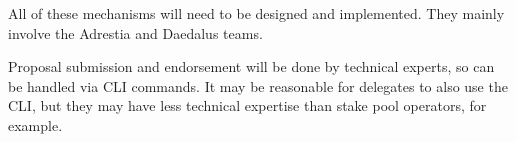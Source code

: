 All of these mechanisms will need to be designed and implemented.  They mainly involve the Adrestia and Daedalus teams.

Proposal submission and endorsement will be done by technical experts, so can be handled via CLI commands.  It may be reasonable for delegates
to also use the CLI, but they may have less technical expertise than stake pool operators, for example.
